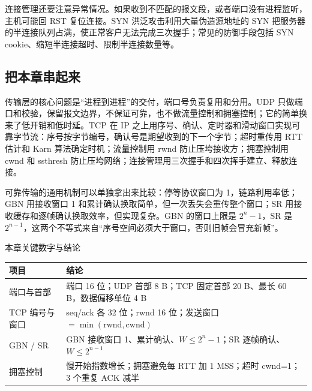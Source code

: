 连接管理还要注意异常情况。如果收到不匹配的报文段，或者端口没有进程监听，主机可能回 RST 复位连接。SYN 洪泛攻击利用大量伪造源地址的 SYN 把服务器的半连接队列占满，使正常客户无法完成三次握手；常见的防御手段包括 SYN cookie、缩短半连接超时、限制半连接数量等。

\subsection{把本章串起来}

传输层的核心问题是“进程到进程”的交付，端口号负责复用和分用。UDP 只做端口和校验，保留报文边界，不保证可靠，也不做流量控制和拥塞控制；它的简单换来了低开销和低时延。TCP 在 IP 之上用序号、确认、定时器和滑动窗口实现可靠字节流：序号按字节编号，确认号是期望收到的下一个字节；超时重传用 RTT 估计和 Karn 算法确定时机；流量控制用 rwnd 防止压垮接收方；拥塞控制用 cwnd 和 ssthresh 防止压垮网络；连接管理用三次握手和四次挥手建立、释放连接。

可靠传输的通用机制可以单独拿出来比较：停等协议窗口为 1，链路利用率低；GBN 用接收窗口 1 和累计确认换取简单，但一次丢失会重传整个窗口；SR 用接收缓存和逐帧确认换取效率，但实现复杂。GBN 的窗口上限是 $2^n-1$，SR 是 $2^{n-1}$，这两个不等式来自“序号空间必须大于窗口，否则旧帧会冒充新帧”。

\begin{tablebox}{本章关键数字与结论}
\centering
\small
\begin{tabularx}{\linewidth}{|p{2.9cm}|X|}
\hline
项目 & 结论 \\
\hline
端口与首部 & 端口 16 位；UDP 首部 8 B；TCP 固定首部 20 B、最长 60 B，数据偏移单位 4 B \\
TCP 编号与窗口 & seq/ack 各 32 位；rwnd 16 位；发送窗口 $=\min(\mathrm{rwnd},\mathrm{cwnd})$ \\
GBN / SR & GBN 接收窗口 1、累计确认、$W\le 2^n-1$；SR 逐帧确认、$W\le 2^{n-1}$ \\
拥塞控制 & 慢开始指数增长；拥塞避免每 RTT 加 1 MSS；超时 cwnd=1；3 个重复 ACK 减半 \\
\hline
\end{tabularx}
\end{tablebox}


